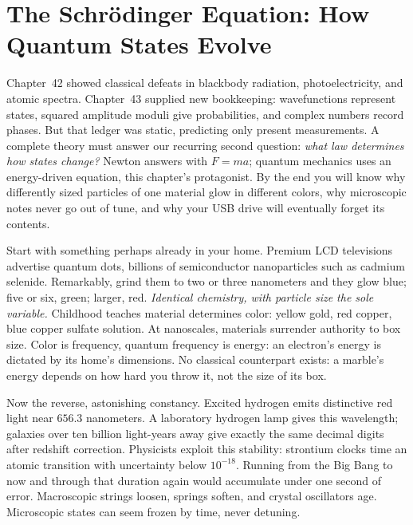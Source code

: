\chapter[The Schrödinger Equation]{The Schrödinger Equation: How Quantum States Evolve}

Chapter~42 showed classical defeats in blackbody radiation, photoelectricity, and atomic spectra. Chapter~43 supplied new bookkeeping: wavefunctions represent states, squared amplitude moduli give probabilities, and complex numbers record phases. But that ledger was static, predicting only present measurements. A complete theory must answer our recurring second question: \emph{what law determines how states change?} Newton answers with \(F=ma\); quantum mechanics uses an energy-driven equation, this chapter's protagonist. By the end you will know why differently sized particles of one material glow in different colors, why microscopic notes never go out of tune, and why your USB drive will eventually forget its contents.


Start with something perhaps already in your home. Premium LCD televisions advertise quantum dots, billions of semiconductor nanoparticles such as cadmium selenide. Remarkably, grind them to two or three nanometers and they glow blue; five or six, green; larger, red. \emph{Identical chemistry, with particle size the sole variable.} Childhood teaches material determines color: yellow gold, red copper, blue copper sulfate solution. At nanoscales, materials surrender authority to box size. Color is frequency, quantum frequency is energy: an electron's energy is dictated by its home's dimensions. No classical counterpart exists: a marble's energy depends on how hard you throw it, not the size of its box.

Now the reverse, astonishing constancy. Excited hydrogen emits distinctive red light near \(656.3\) nanometers. A laboratory hydrogen lamp gives this wavelength; galaxies over ten billion light-years away give exactly the same decimal digits after redshift correction. Physicists exploit this stability: strontium clocks time an atomic transition with uncertainty below \(10^{-18}\). Running from the Big Bang to now and through that duration again would accumulate under one second of error. Macroscopic strings loosen, springs soften, and crystal oscillators age. Microscopic states can seem frozen by time, never detuning.

